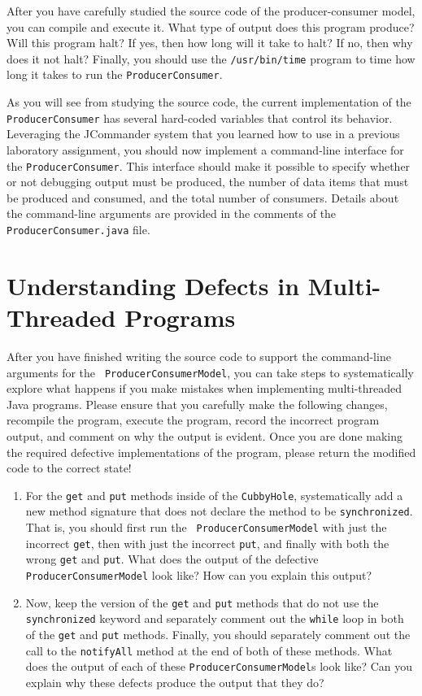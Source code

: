 After you have carefully studied the source code of the producer-consumer model, you can compile and execute it.  What
type of output does this program produce?  Will this program halt?  If yes, then how long will it take to halt?  If no,
then why does it not halt?  Finally, you should use the {\tt /usr/bin/time} program to time how long it takes to run the
{\tt ProducerConsumer}.

As you will see from studying the source code, the current implementation of the {\tt ProducerConsumer} has several
hard-coded variables that control its behavior. Leveraging the JCommander system that you learned how to use in a
previous laboratory assignment, you should now implement a command-line interface for the {\tt ProducerConsumer}.
This interface should make it possible to specify whether or not debugging output must be produced, the number of data
items that must be produced and consumed, and the total number of consumers.  Details about the command-line arguments
are provided in the comments of the {\tt ProducerConsumer.java} file.

\section*{Understanding Defects in Multi-Threaded Programs}

After you have finished writing the source code to support the command-line arguments for the {\tt
  ProducerConsumerModel}, you can take steps to systematically explore what happens if you make mistakes when
implementing multi-threaded Java programs.  Please ensure that you carefully make the following changes, recompile the
program, execute the program, record the incorrect program output, and comment on why the output is evident.  Once you
are done making the required defective implementations of the program, please return the modified code to the correct
state!

\begin{enumerate}

  \item For the {\tt get} and {\tt put} methods inside of the {\tt CubbyHole}, systematically add a new method signature
    that does not declare the method to be {\tt synchronized}.  That is, you should first run the {\tt
      ProducerConsumerModel} with just the incorrect {\tt get}, then with just the incorrect {\tt put}, and finally with
    both the wrong {\tt get} and {\tt put}.   What does the output of the defective {\tt ProducerConsumerModel} look
    like?  How can you explain this output?  

  \item Now, keep the version of the {\tt get} and {\tt put} methods that do not use the {\tt synchronized} keyword and
    separately comment out the {\tt while} loop in both of the {\tt get} and {\tt put} methods.  Finally, you should
    separately comment out the call to the {\tt notifyAll} method at the end of both of these methods.  What does the
    output of each of these {\tt ProducerConsumerModel}s look like? Can you explain why these defects produce the output
    that they do?

\end{enumerate}

